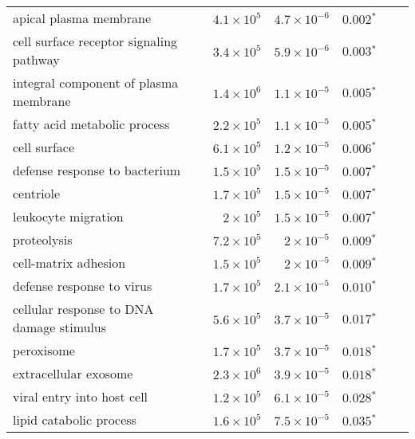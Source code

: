 \documentclass{article}
\begin{document}
\begin{longtable}{|l|r|r|r|r|r|}
                            apical plasma membrane & $4.1\times 10^{5}$ &  $4.7\times 10^{-6}$ &              $\bm{ 0.002{^*}}$ \\
           cell surface receptor signaling pathway & $3.4\times 10^{5}$ &  $5.9\times 10^{-6}$ &              $\bm{ 0.003{^*}}$ \\
             integral component of plasma membrane & $1.4\times 10^{6}$ &  $1.1\times 10^{-5}$ &              $\bm{ 0.005{^*}}$ \\
                      fatty acid metabolic process & $2.2\times 10^{5}$ &  $1.1\times 10^{-5}$ &              $\bm{ 0.005{^*}}$ \\
                                      cell surface & $6.1\times 10^{5}$ &  $1.2\times 10^{-5}$ &              $\bm{ 0.006{^*}}$ \\
                     defense response to bacterium & $1.5\times 10^{5}$ &  $1.5\times 10^{-5}$ &              $\bm{ 0.007{^*}}$ \\
                                         centriole & $1.7\times 10^{5}$ &  $1.5\times 10^{-5}$ &              $\bm{ 0.007{^*}}$ \\
                               leukocyte migration &  $ 2\times 10^{5}$ &  $1.5\times 10^{-5}$ &              $\bm{ 0.007{^*}}$ \\
                                       proteolysis & $7.2\times 10^{5}$ &   $ 2\times 10^{-5}$ &              $\bm{ 0.009{^*}}$ \\
                              cell-matrix adhesion & $1.5\times 10^{5}$ &   $ 2\times 10^{-5}$ &              $\bm{ 0.009{^*}}$ \\
                         defense response to virus & $1.7\times 10^{5}$ &  $2.1\times 10^{-5}$ &              $\bm{ 0.010{^*}}$ \\
          cellular response to DNA damage stimulus & $5.6\times 10^{5}$ &  $3.7\times 10^{-5}$ &              $\bm{ 0.017{^*}}$ \\
                                        peroxisome & $1.7\times 10^{5}$ &  $3.7\times 10^{-5}$ &              $\bm{ 0.018{^*}}$ \\
                             extracellular exosome & $2.3\times 10^{6}$ &  $3.9\times 10^{-5}$ &              $\bm{ 0.018{^*}}$ \\
                        viral entry into host cell & $1.2\times 10^{5}$ &  $6.1\times 10^{-5}$ &              $\bm{ 0.028{^*}}$ \\
                           lipid catabolic process & $1.6\times 10^{5}$ &  $7.5\times 10^{-5}$ &              $\bm{ 0.035{^*}}$ \\

\end{longtable}
\end{document}
